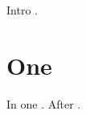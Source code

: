 \documentclass{article}
\begin{document}
\bibliographyunit[\section]
Intro \cite{Smith2020}.
\section{One}
In one \cite{zeta}.
\bibliographyunit
After \cite{mid}.


\end{document}
